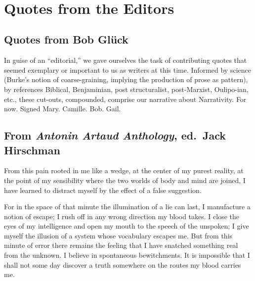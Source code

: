 \documentclass[
]{memoir}
\begin{document}
~

\hypertarget{quotes-from-the-editors}{%
\chapter{Quotes from the Editors}\label{quotes-from-the-editors}}

\hypertarget{quotes-from-bob-gluxfcck}{%
\section*{Quotes from Bob Glück}\label{quotes-from-bob-gluxfcck}}

In guise of an ``editorial,'' we gave ourselves the task of contributing
quotes that seemed exemplary or important to us as writers at this time.
Informed by science (Burke's notion of coarse-graining, implying the
production of prose as pattern), by references Biblical, Benjaminian,
post structuralist, post-Marxist, Oulipo-ian, etc., these cut-outs,
compounded, comprise our narrative about Narrativity. For now. Signed
Mary. Camille. Bob. Gail. ~

\hypertarget{from-antonin-artaud-anthology-ed.-jack-hirschman}{%
\section*{\texorpdfstring{From \emph{Antonin Artaud Anthology}, ed.~Jack
Hirschman}{From Antonin Artaud Anthology, ed.~Jack Hirschman}}\label{from-antonin-artaud-anthology-ed.-jack-hirschman}}

From this pain rooted in me like a wedge, at the center of my purest
reality, at the point of my sensibility where the two worlds of body and
mind are joined, I have learned to distract myself by the effect of a
false suggestion.

For in the space of that minute the illumination of a lie can last, I
manufacture a notion of escape; I rush off in any wrong direction my
blood takes. I close the eyes of my intelligence and open my mouth to
the speech of the unspoken; I give myself the illusion of a system whose
vocabulary escapes me. But from this minute of error there remains the
feeling that I have snatched something real from the unknown. I believe
in spontaneous bewitchments. It is impossible that I shall not some day
discover a truth somewhere on the routes my blood carries me.
\end{document}
